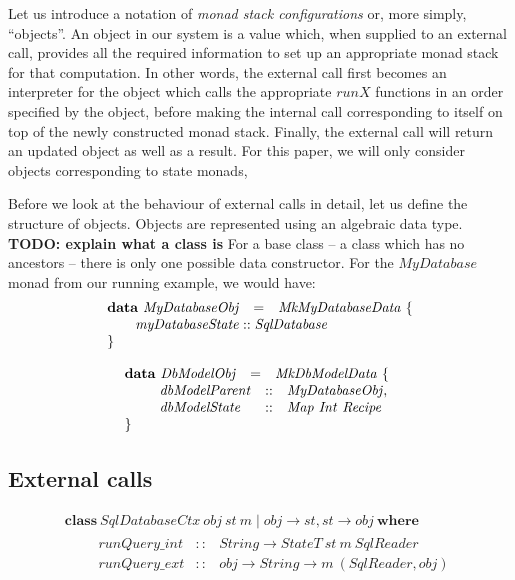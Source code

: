Let us introduce a notation of \emph{monad stack configurations} or, more simply, ``objects''. An object in our system is a value which, when supplied to an external call, provides all the required information to set up an appropriate monad stack for that computation. In other words, the external call first becomes an interpreter for the object which calls the appropriate $\mathit{runX}$ functions in an order specified by the object, before making the internal call corresponding to itself on top of the newly constructed monad stack. Finally, the external call will return an updated object as well as a result. For this paper, we will only consider objects corresponding to state monads,

Before we look at the behaviour of external calls in detail, let us define the structure of objects. Objects are represented using an algebraic data type. \textbf{TODO: explain what a class is} For a base class -- a class which has no ancestors -- there is only one possible data constructor. For the $\mathit{MyDatabase}$ monad from our running example, we would have:
\begin{displaymath}
\begin{array}{lcl}
\mathbf{data}~\mathit{MyDatabaseObj} & = & \mathit{MkMyDatabaseData}~\{ \\
\multicolumn{3}{l}{\qquad \mathit{myDatabaseState} :: \mathit{SqlDatabase} }  \\
\} && 
\end{array}
\end{displaymath}

\begin{displaymath}
\begin{array}{lcl}
\mathbf{data}~\mathit{DbModelObj} & = & \mathit{MkDbModelData}~\{ \\
\multicolumn{3}{l}{\qquad \begin{array}{lcl}
\mathit{dbModelParent} & :: & \mathit{MyDatabaseObj}, \\
\mathit{dbModelState} & :: & \mathit{Map}~\mathit{Int}~\mathit{Recipe}
\end{array}  }  \\
\} && 
\end{array}
\end{displaymath}

\subsection{External calls}

\begin{displaymath}
\begin{array}{l}
\mathbf{class}~\mathit{SqlDatabaseCtx}~\mathit{obj}~\mathit{st}~m \mid \mathit{obj} \to \mathit{st}, \mathit{st} \to \mathit{obj}~\mathbf{where}\\
\qquad \begin{array}{lcl}
\mathit{runQuery\_int} & :: & \mathit{String} \to \mathit{StateT}~\mathit{st}~m~\mathit{SqlReader} \\
\mathit{runQuery\_ext} & :: & \mathit{obj} \to \mathit{String} \to m~(\mathit{SqlReader}, \mathit{obj})
\end{array}
\end{array}
\end{displaymath}